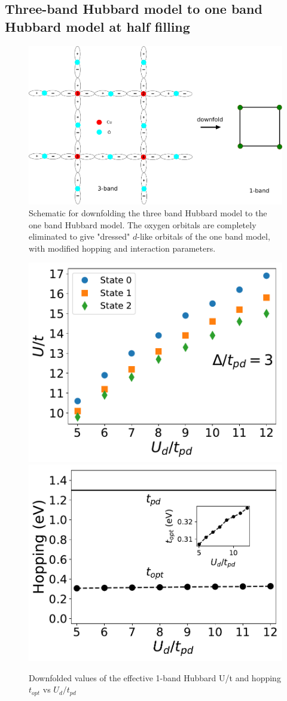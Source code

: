\documentclass[prl,12pt,onecolumn,nofootinbib,notitlepage,english,superscriptaddress]{revtex4-1}
\begin{document}
\subsection{Three-band Hubbard model to one band Hubbard model at half filling}
\begin{figure}[htpb]
\centering
\includegraphics[width=1\linewidth]{./three_band_figure.pdf}
\caption{Schematic for downfolding the three band Hubbard model to the one band Hubbard model. 
The oxygen orbitals are completely eliminated to give "dressed" $d$-like orbitals of the one band model, with modified hopping 
and interaction parameters.}
\label{fig:hamfit} 
\end{figure}	

\begin{figure}[htpb]
\centering
\includegraphics[width=0.49\linewidth]{./downfolded_U.pdf}
\includegraphics[width=0.49\linewidth]{./Hopping_vs_U.pdf}
\caption{Downfolded values of the effective 1-band Hubbard U/t and hopping $t_{opt}$ vs $U_d/t_{pd}$}
\label{fig:hamfit} 
\end{figure}	
\end{document}
